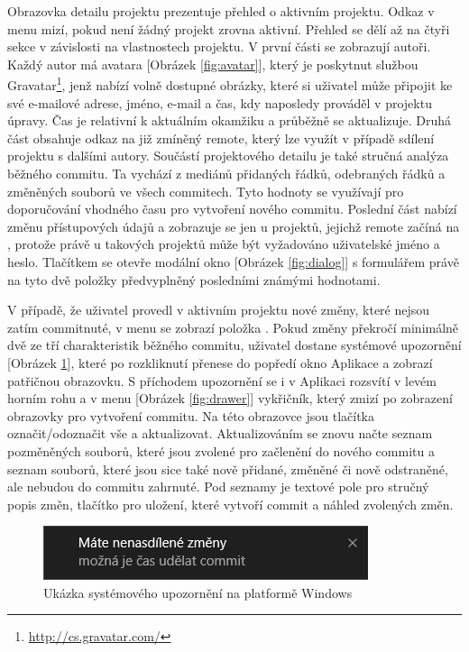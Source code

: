 Obrazovka detailu projektu prezentuje přehled o aktivním projektu. Odkaz v menu mizí, pokud není žádný projekt zrovna aktivní. Přehled se dělí až na čtyři sekce v závislosti na vlastnostech projektu. V první části se zobrazují autoři. Každý autor má avatara [Obrázek \ref{fig:avatar}], který je poskytnut službou Gravatar\footnote{\url{http://cs.gravatar.com/}}, jenž nabízí volně dostupné obrázky, které si uživatel může připojit ke své e-mailové adrese, jméno, e-mail a čas, kdy naposledy prováděl v projektu úpravy. Čas je relativní k aktuálním okamžiku a průběžně se aktualizuje. Druhá část obsahuje odkaz na již zmíněný remote, který lze využít v případě sdílení projektu s dalšími autory. Součástí projektového detailu je také stručná analýza běžného commitu. Ta vychází z mediánů přidaných řádků, odebraných řádků a změněných souborů ve všech commitech. Tyto hodnoty se využívají pro doporučování vhodného času pro vytvoření nového commitu. Poslední část nabízí změnu přístupových údajů a zobrazuje se jen u projektů, jejichž remote začíná na , protože právě u takových projektů může být vyžadováno uživatelské jméno a heslo. Tlačítkem  se otevře modální okno [Obrázek \ref{fig:dialog}] s formulářem právě na tyto dvě položky předvyplněný posledními známými hodnotami.

V případě, že uživatel provedl v aktivním projektu nové změny, které nejsou zatím commitnuté, v menu se zobrazí položka . Pokud změny překročí minimálně dvě ze tří charakteristik běžného commitu, uživatel dostane systémové upozornění [Obrázek \ref{fig:notification}], které po rozkliknutí přenese do popředí okno Aplikace a zobrazí patřičnou obrazovku. S příchodem upozornění se i v Aplikaci rozsvítí v levém horním rohu a v menu [Obrázek \ref{fig:drawer}] vykřičník, který zmizí po zobrazení obrazovky pro vytvoření commitu. Na této obrazovce jsou tlačítka označit/odoznačit vše a aktualizovat. Aktualizováním se znovu načte seznam pozměněných souborů, které jsou zvolené pro začlenění do nového commitu a seznam souborů, které jsou sice také nově přidané, změněné či nově odstraněné, ale nebudou do commitu zahrnuté. Pod seznamy je textové pole pro stručný popis změn, tlačítko pro uložení, které vytvoří commit a náhled zvolených změn.

\FloatBarrier
\begin{figure}[ht]
	\centering
	\includegraphics[scale=0.65]{sections/ui/images/notification.png}
	\caption[Systémové upozornění]{Ukázka systémového upozornění na platformě Windows}
	\label{fig:notification}
\end{figure}
\FloatBarrier

